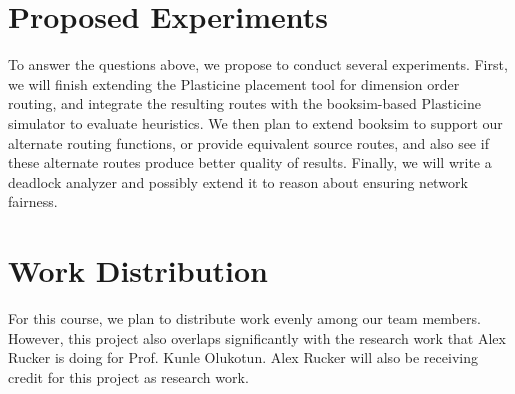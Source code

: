 \documentclass[11pt,twocolumn]{article}
\begin{document}
\section{Proposed Experiments}
To answer the questions above, we propose to conduct several experiments.
First, we will finish extending the Plasticine placement tool for dimension
order routing, and integrate the resulting routes with the booksim-based
Plasticine simulator to evaluate heuristics. We then plan to extend booksim to
support our alternate routing functions, or provide equivalent source routes,
and also see if these alternate routes produce better quality of results.
Finally, we will write a deadlock analyzer and possibly extend it to reason
about ensuring network fairness. 

\section{Work Distribution}
For this course, we plan to distribute work evenly among our team members.
However, this project also overlaps significantly with the research work that
Alex Rucker is doing for Prof. Kunle Olukotun. Alex Rucker will also be
receiving credit for this project as research work.
\end{document}
